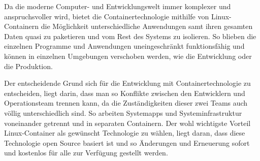 
Da die moderne Computer- und Entwicklungswelt immer komplexer und anspruchsvoller wird, bietet die Containertechnologie mithilfe von Linux-Containern die Möglichkeit unterschiedliche Anwendungen samt ihren gesamten Daten quasi zu paketieren und vom Rest des Systems zu isolieren.  So blieben die einzelnen Programme und Anwendungen uneingeschränkt funktionsfähig und können in einzelnen Umgebungen verschoben werden, wie die Entwicklung oder die Produktion. \cite{Container}

Der entscheidende Grund sich für die Entwicklung mit Containertechnologie zu entscheiden, liegt darin, dass man so Konflikte zwischen den Entwicklern und Operationsteam trennen kann, da die Zuständigkeiten dieser zwei Teams auch völlig unterschiedlich sind. So arbeiten Systemapps und Systeminfrastruktur voneinander getrennt und in separaten Containern. Der wohl wichtigste Vorteil Linux-Container als gewünscht Technologie zu wählen, liegt daran, dass diese Technologie open Source basiert ist und so Änderungen und Erneuerung sofort und kostenlos für alle zur Verfügung gestellt werden. \cite{Container}
